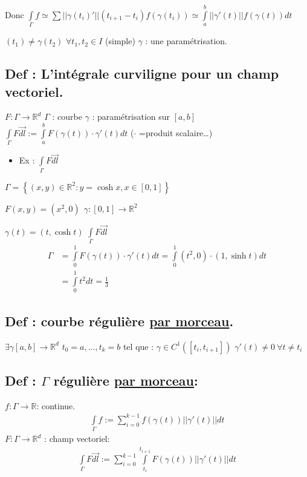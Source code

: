 \documentclass[11pt]{article}
\begin{document}
Donc \(\int\limits_{\Gamma}f \simeq \sum\limits ||\gamma(t_i)'|| (t_{i+1} - t_i) f(\gamma(t_i)) \simeq \int\limits_{a}^{b} ||\gamma'(t)|| f(\gamma(t)) dt\)

\((t_1) \neq \gamma(t_2)\) \(\forall t_1,t_2 \in I\) (simple)
\(\gamma\) : une paramétrisation.

\subsection{Def : L'intégrale curviligne pour un champ vectoriel.}
\label{sec:orgheadline23}

\(F : \Gamma \rightarrow \mathbb{R}^d\)
\(\Gamma\) : courbe \(\gamma\) : paramétrisation sur \(\left[a,b\right]\)
\(\int\limits_{\Gamma} F \vec{dl} := \int\limits_{a}^{b} F(\gamma(t))\cdot\gamma'(t) dt\) (\(\cdot\) =produit scalaire\ldots{})

\begin{itemize}
\item Ex : \(\int\limits_{\Gamma} F \vec{dl}\)
\end{itemize}
\(\Gamma = \left\lbrace (x,y) \in \mathbb{R}^2: y = \cosh x, x \in \left[0,1\right] \right\rbrace\)

\(F(x,y) = (x^2,0)\ \ \gamma: \left[0,1\right] \rightarrow \mathbb{R}^2\)

\(\gamma(t) = (t,\cosh t)\)
\(\int\limits_{\Gamma} F \vec{dl}\)
\begin{align*}
\Gamma &=  \int\limits_{0}^{1} F(\gamma(t)) \cdot \gamma'(t) dt = \int\limits_{0}^{1} (t^2,0)\cdot(1,\sinh t) dt\\
&= \int\limits_{0}^{1} t^2 dt = \frac{1}{3}
\end{align*} 

\subsection{Def : courbe régulière \underline{par morceau}.}
\label{sec:orgheadline24}
\(\exists \gamma \left[a,b\right] \rightarrow \mathbb{R}^d\)
\(t_0=a,...,t_k=b\)
tel que : \(\gamma \in C^1 \left(\left[t_i,t_{i+1}\right]\right)\)
\(\gamma'(t) \neq 0\ \forall t \neq t_i\)

\subsection{Def : \(\Gamma\) régulière \underline{par morceau}:}
\label{sec:orgheadline26}
\(f : \Gamma \rightarrow \mathbb{R}\): continue.
\begin{align*}
\int\limits_{\Gamma} f := \sum\limits_{i=0}^{k-1} f(\gamma(t)) || \gamma'(t)|| dt
\end{align*}
\(F: \Gamma \rightarrow \mathbb{R}^d\) : champ vectoriel:
\begin{align*}
\int\limits_{\Gamma}F \vec{dl} := \sum\limits_{i=0}^{k-1} \int\limits_{t_i}^{t_{i+1}} F(\gamma(t)) || \gamma'(t)|| dt
\end{align*}
\end{document}
